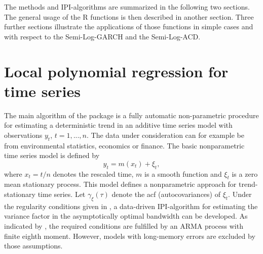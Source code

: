 The methods and IPI-algorithms are summarized in the following two sections. The general usage of the R functions is then described in another section. Three further sections illustrate the applications of those functions in simple cases and with respect to the Semi-Log-GARCH and the Semi-Log-ACD.

\section{Local polynomial regression for time series} \label{sec:locpoly}

The main algorithm of the  package is a fully automatic non-parametric procedure for estimating a deterministic trend in an additive time series model with observations $y_{t}$, $t=1, ..., n$. 
The data under consideration can for example be from environmental statistics, economics or finance.
The basic nonparametric time series model is defined by
\begin{equation}\label{eq:Semi-MTS}
y_t= m\left(x_t\right) + \xi_t, 
\end{equation} 
where $x_t=t/n$ denotes the rescaled time, $m$ is a smooth function and $\xi_t$ is a zero mean stationary process. This model defines a nonparametric approach for trend-stationary time series. Let $\gamma_{\xi}\left(\tau\right)$ denote the acf (autocovariances) of $\xi_t$. 
Under the regularity conditions given in \citet{buhlmann1996locally}, a data-driven IPI-algorithm for estimating the variance factor in the asymptotically optimal bandwidth can be developed. As indicated by \citet{fenggriesfritz2020}, the required conditions are fulfilled by an ARMA process with finite eighth moment. 
However, models with long-memory errors are excluded by those assumptions.

